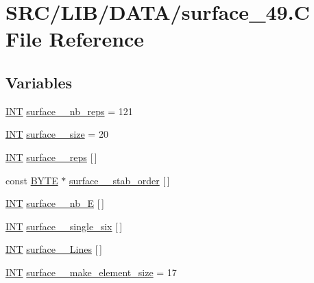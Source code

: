 \hypertarget{surface__49_8_c}{}\section{S\+R\+C/\+L\+I\+B/\+D\+A\+T\+A/surface\+\_\+49.C File Reference}
\label{surface__49_8_c}
\subsection*{Variables}
\begin{DoxyCompactItemize}
\item 
\mbox{\hyperlink{galois_8h_a09fddde158a3a20bd2dcadb609de11dc}{I\+NT}} \mbox{\hyperlink{surface__49_8_c_a48efff6d7735f17bca8779c31190d909}{surface\+\_\+\_\+nb\+\_\+reps}} = 121
\item 
\mbox{\hyperlink{galois_8h_a09fddde158a3a20bd2dcadb609de11dc}{I\+NT}} \mbox{\hyperlink{surface__49_8_c_aedd19a8a276ea24c211f9424efd4c35d}{surface\+\_\+\_\+size}} = 20
\item 
\mbox{\hyperlink{galois_8h_a09fddde158a3a20bd2dcadb609de11dc}{I\+NT}} \mbox{\hyperlink{surface__49_8_c_a21097ddef90edbc7b4f7b9d79a78b156}{surface\+\_\+\_\+reps}} \mbox{[}$\,$\mbox{]}
\item 
const \mbox{\hyperlink{galois_8h_ab6cc7b4aeb6ea31aba2b3fbfc83ff5e6}{B\+Y\+TE}} $\ast$ \mbox{\hyperlink{surface__49_8_c_ad14407db2d0fd6e200281e54c92331a5}{surface\+\_\+\_\+stab\+\_\+order}} \mbox{[}$\,$\mbox{]}
\item 
\mbox{\hyperlink{galois_8h_a09fddde158a3a20bd2dcadb609de11dc}{I\+NT}} \mbox{\hyperlink{surface__49_8_c_a16779407e90d9c1096d59f7bf7d4af6b}{surface\+\_\+\_\+nb\+\_\+E}} \mbox{[}$\,$\mbox{]}
\item 
\mbox{\hyperlink{galois_8h_a09fddde158a3a20bd2dcadb609de11dc}{I\+NT}} \mbox{\hyperlink{surface__49_8_c_ab5022eb2bc88758eebb98fc0e841b551}{surface\+\_\+\_\+single\+\_\+six}} \mbox{[}$\,$\mbox{]}
\item 
\mbox{\hyperlink{galois_8h_a09fddde158a3a20bd2dcadb609de11dc}{I\+NT}} \mbox{\hyperlink{surface__49_8_c_aa24a77231b78abb4a67c72862ee17150}{surface\+\_\+\_\+\+Lines}} \mbox{[}$\,$\mbox{]}
\item 
\mbox{\hyperlink{galois_8h_a09fddde158a3a20bd2dcadb609de11dc}{I\+NT}} \mbox{\hyperlink{surface__49_8_c_a3c4d31e15e3ba9c9e3b252a8ede1ed1f}{surface\+\_\+\_\+make\+\_\+element\+\_\+size}} = 17
\item 

\end{DoxyCompactItemize}
